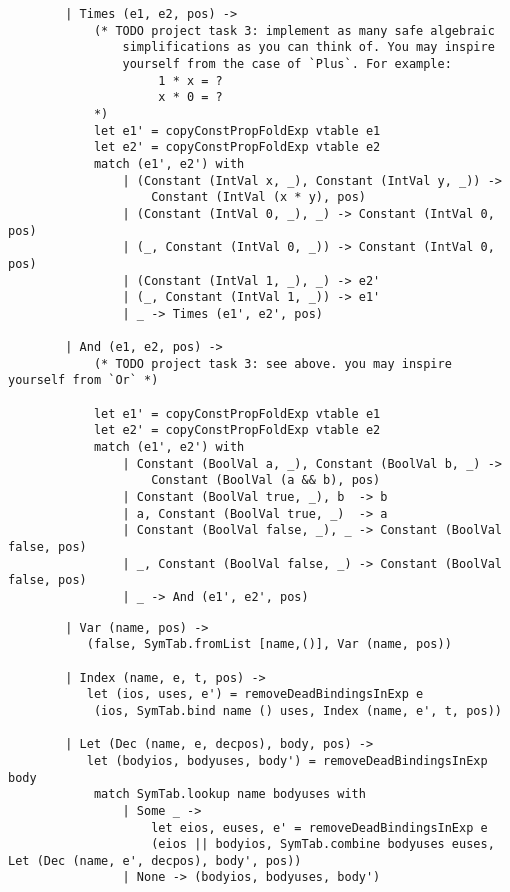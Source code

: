 \begin{verbatim}
        | Times (e1, e2, pos) ->
            (* TODO project task 3: implement as many safe algebraic
                simplifications as you can think of. You may inspire 
                yourself from the case of `Plus`. For example:
                     1 * x = ? 
                     x * 0 = ?
            *)
            let e1' = copyConstPropFoldExp vtable e1
            let e2' = copyConstPropFoldExp vtable e2
            match (e1', e2') with
                | (Constant (IntVal x, _), Constant (IntVal y, _)) ->
                    Constant (IntVal (x * y), pos)
                | (Constant (IntVal 0, _), _) -> Constant (IntVal 0, pos)
                | (_, Constant (IntVal 0, _)) -> Constant (IntVal 0, pos)
                | (Constant (IntVal 1, _), _) -> e2'
                | (_, Constant (IntVal 1, _)) -> e1'
                | _ -> Times (e1', e2', pos)
 
        | And (e1, e2, pos) ->
            (* TODO project task 3: see above. you may inspire yourself from `Or` *)

            let e1' = copyConstPropFoldExp vtable e1
            let e2' = copyConstPropFoldExp vtable e2
            match (e1', e2') with
                | Constant (BoolVal a, _), Constant (BoolVal b, _) ->
                    Constant (BoolVal (a && b), pos)
                | Constant (BoolVal true, _), b  -> b
                | a, Constant (BoolVal true, _)  -> a
                | Constant (BoolVal false, _), _ -> Constant (BoolVal false, pos)
                | _, Constant (BoolVal false, _) -> Constant (BoolVal false, pos)
                | _ -> And (e1', e2', pos)
\end{verbatim}



\begin{verbatim}
        | Var (name, pos) ->
           (false, SymTab.fromList [name,()], Var (name, pos))

        | Index (name, e, t, pos) ->
           let (ios, uses, e') = removeDeadBindingsInExp e
            (ios, SymTab.bind name () uses, Index (name, e', t, pos)) 

        | Let (Dec (name, e, decpos), body, pos) ->
           let (bodyios, bodyuses, body') = removeDeadBindingsInExp body
            match SymTab.lookup name bodyuses with
                | Some _ ->
                    let eios, euses, e' = removeDeadBindingsInExp e
                    (eios || bodyios, SymTab.combine bodyuses euses, Let (Dec (name, e', decpos), body', pos))
                | None -> (bodyios, bodyuses, body') 
\end{verbatim}

